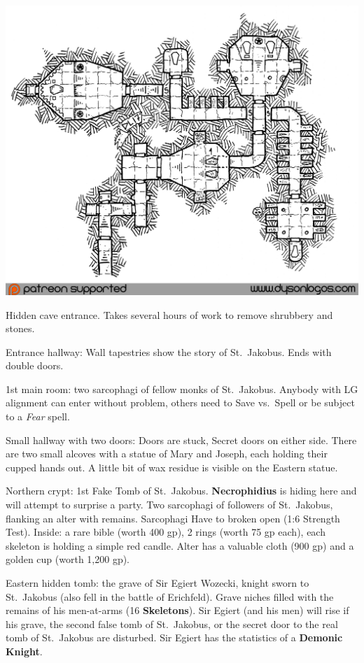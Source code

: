 \documentclass[
]{book}
\begin{document}
\begin{center}\includegraphics[width=1\linewidth]{graphics/false-tombs-patreon} \end{center}

Hidden cave entrance. Takes several hours of work to remove shrubbery and stones.

Entrance hallway: Wall tapestries show the story of St.~Jakobus. Ends with double doors.

1st main room: two sarcophagi of fellow monks of St.~Jakobus. Anybody with LG alignment can enter without problem, others need to Save vs.~Spell or be subject to a \emph{Fear} spell.

Small hallway with two doors: Doors are stuck, Secret doors on either side. There are two small alcoves with a statue of Mary and Joseph, each holding their cupped hands out. A little bit of wax residue is visible on the Eastern statue.

Northern crypt: 1st Fake Tomb of St.~Jakobus. \textbf{Necrophidius} is hiding here and will attempt to surprise a party. Two sarcophagi of followers of St.~Jakobus, flanking an alter with remains. Sarcophagi Have to broken open (1:6 Strength Test). Inside: a rare bible (worth 400 gp), 2 rings (worth 75 gp each), each skeleton is holding a simple red candle. Alter has a valuable cloth (900 gp) and a golden cup (worth 1,200 gp).

Eastern hidden tomb: the grave of Sir Egiert Wozecki, knight sworn to St.~Jakobus (also fell in the battle of Erichfeld). Grave niches filled with the remains of his men-at-arms (16 \textbf{Skeletons}). Sir Egiert (and his men) will rise if his grave, the second false tomb of St.~Jakobus, or the secret door to the real tomb of St.~Jakobus are disturbed. Sir Egiert has the statistics of a \textbf{Demonic Knight}.
\end{document}
